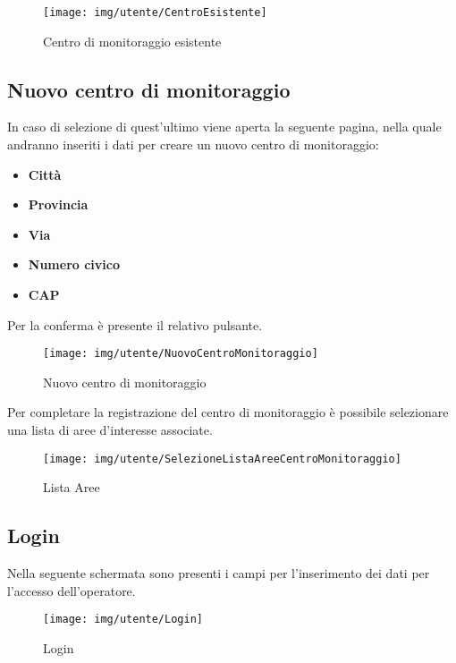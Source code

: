 \begin{figure}[h]
	\centering
	\texttt{[image: img/utente/CentroEsistente]}
	\caption{Centro di monitoraggio esistente}
	\label{fig:centroesistente}
\end{figure}

\subsection{Nuovo centro di monitoraggio} \label{NuovoCentroDiMonitoraggio}
In caso di selezione di quest'ultimo viene aperta la seguente pagina, nella quale andranno inseriti i dati per creare un nuovo centro di monitoraggio:
\begin{itemize}
	\item \textbf{Città}
	\item \textbf{Provincia}
	\item \textbf{Via}
	\item \textbf{Numero civico}
	\item \textbf{CAP}
\end{itemize}

\pagebreak

Per la conferma è presente il relativo pulsante.
	
\begin{figure}[h]
	\centering
	\texttt{[image: img/utente/NuovoCentroMonitoraggio]}
	\caption{Nuovo centro di monitoraggio}
	\label{fig:nuovocentromonitoraggio}
\end{figure}
	
Per completare la registrazione del centro di monitoraggio è possibile selezionare una lista di aree d'interesse associate.

\begin{figure}[h]
	\centering
	\texttt{[image: img/utente/SelezioneListaAreeCentroMonitoraggio]}
	\caption{Lista Aree}
	\label{fig:selezionelistaareecentromonitoraggio}
\end{figure}

\pagebreak
\subsection{Login}
Nella seguente schermata sono presenti i campi per l'inserimento dei dati per l'accesso dell'operatore.
\begin{figure}[h]
	\centering
	\texttt{[image: img/utente/Login]}
	\caption{Login}
	\label{fig:login}
\end{figure}


